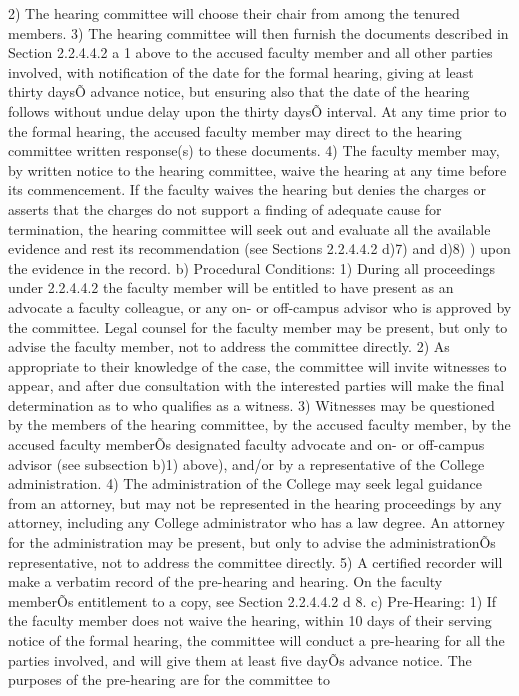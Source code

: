 \documentclass[letterpaper, 11pt]{article}
\begin{document}
2) The hearing committee will choose their chair from among the tenured members.
3) The hearing committee will then furnish the documents described in Section 2.2.4.4.2 a 1 above to the accused faculty member and all other parties involved, with notification of the date for the formal hearing, giving at least thirty daysÕ advance notice, but ensuring also that the date of the hearing follows without undue delay upon the thirty daysÕ interval.  At any time prior to the formal hearing, the accused faculty member may direct to the hearing committee written response(s) to these documents.
4) The faculty member may, by written notice to the hearing committee, waive the hearing at any time before its commencement.  If the faculty waives the hearing but denies the charges or asserts that the charges do not support a finding of adequate cause for termination, the hearing committee will seek out and evaluate all the available evidence and rest its recommendation (see Sections 2.2.4.4.2 d)7) and d)8) ) upon the evidence in the record.
b) Procedural Conditions:
1) During all proceedings under 2.2.4.4.2 the faculty member will be entitled to have present as an advocate a faculty colleague, or any on- or off-campus advisor who is approved by the committee.  Legal counsel for the faculty member may be present, but only to advise the faculty member, not to address the committee directly.
2) As appropriate to their knowledge of the case, the committee will invite witnesses to appear, and after due consultation with the interested parties will make the final determination as to who qualifies as a witness.
3) Witnesses may be questioned by the members of the hearing committee, by the accused faculty member, by the accused faculty memberÕs designated faculty advocate and on- or off-campus advisor (see subsection b)1) above), and/or by a representative of the College administration.
4) The administration of the College may seek legal guidance from an attorney, but may not be represented in the hearing proceedings by any attorney, including any College administrator who has a law degree.  An attorney for the administration may be present, but only to advise the administrationÕs representative, not to address the committee directly.
5) A certified recorder will make a verbatim record of the pre-hearing and hearing.
   {On the faculty memberÕs entitlement to a copy, see Section 2.2.4.4.2 d 8. }
c) Pre-Hearing:
1) If the faculty member does not waive the hearing, within 10 days of their serving notice of the formal hearing, the committee will conduct a pre-hearing for all the parties involved, and will give them at least five dayÕs advance notice.  The purposes of the pre-hearing are for the committee to
\end{document}
